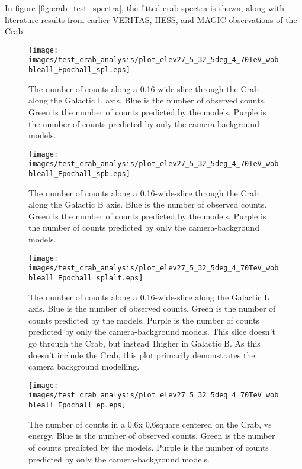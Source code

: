     In figure \ref{fig:crab_test_spectra}, the fitted crab spectra is shown, along with literature results from earlier VERITAS, HESS, and MAGIC observations of the Crab.
    
    \begin{figure}[h]
      \centering
      \texttt{[image: images/test\_crab\_analysis/plot\_elev27\_5\_32\_5deg\_4\_70TeV\_wobbleall\_Epochall\_spl.eps]}
      \caption[Crab Profile along Galactic L]
      {
        The number of counts along a 0.16\degree-wide-slice through the Crab along the Galactic L axis.
        Blue is the number of observed counts.
        Green is the number of counts predicted by the models.
        Purple is the number of counts predicted by only the camera-background models.
      }
      \label{fig:crab_profile_l}
    \end{figure}

    \begin{figure}[h]
      \centering
      \texttt{[image: images/test\_crab\_analysis/plot\_elev27\_5\_32\_5deg\_4\_70TeV\_wobbleall\_Epochall\_spb.eps]}
      \caption[Crab Profile along Galactic B]
      {
        The number of counts along a 0.16\degree-wide-slice through the Crab along the Galactic B axis.
        Blue is the number of observed counts.
        Green is the number of counts predicted by the models.
        Purple is the number of counts predicted by only the camera-background models.
      }
      \label{fig:crab_profile_b}
    \end{figure}
    
    \begin{figure}[h]
      \centering
      \texttt{[image: images/test\_crab\_analysis/plot\_elev27\_5\_32\_5deg\_4\_70TeV\_wobbleall\_Epochall\_splalt.eps]}
      \caption[Crab Profile along Galactic L Off Source]
      {
        The number of counts along a 0.16\degree-wide-slice along the Galactic L axis.
        Blue is the number of observed counts.
        Green is the number of counts predicted by the models.
        Purple is the number of counts predicted by only the camera-background models.
        This slice doesn't go through the Crab, but instead 1\degree higher in Galactic B.
        As this doesn't include the Crab, this plot primarily demonstrates the camera background modelling.
      }
      \label{fig:crab_profile_l_off}
    \end{figure}

    \begin{figure}[h]
      \centering
      \texttt{[image: images/test\_crab\_analysis/plot\_elev27\_5\_32\_5deg\_4\_70TeV\_wobbleall\_Epochall\_ep.eps]}
      \caption[Crab Profile in Energy]
      {
        The number of counts in a 0.6\degree x 0.6\degree square centered on the Crab, vs energy.
        Blue is the number of observed counts.
        Green is the number of counts predicted by the models.
        Purple is the number of counts predicted by only the camera-background models.
      }
      \label{fig:crab_profile_energy}
    \end{figure}
    
